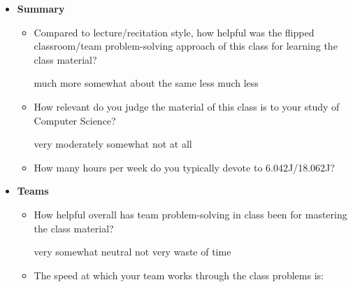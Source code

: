 \documentclass[handout]{mcs}
\begin{document}
\begin{itemize}

\item \textbf{Summary}

\begin{itemize}

\item Compared to lecture/recitation style, how helpful was the
  flipped classroom/team problem-solving approach of this class for
  learning the class material?

\begin{center}
much more \hspace{0.3in} somewhat \hspace{0.3in} about the
same \hspace{0.3in} less \hspace{0.3in} much less
\end{center}

\item How relevant do you judge the material of this class is to your
  study of Computer Science?

\begin{center}
very\hspace{0.3in} moderately\hspace{0.3in} somewhat \hspace{0.3in} not at all
\end{center}

\item How many hours per week do you typically devote to 6.042J/18.062J?\brule{0.6in}

\end{itemize}

\item \textbf{Teams}
\begin{itemize}

\item How helpful overall has team problem-solving in class been for
  mastering the class material?

\begin{center}
very\hspace{0.5in} somewhat \hspace{0.5in} neutral\hspace{0.5in} not
very \hspace{0.5in} waste of time
\end{center}

\item The speed at which your team works through the class problems
  is:


\end{itemize}
\end{itemize}
\end{document}
